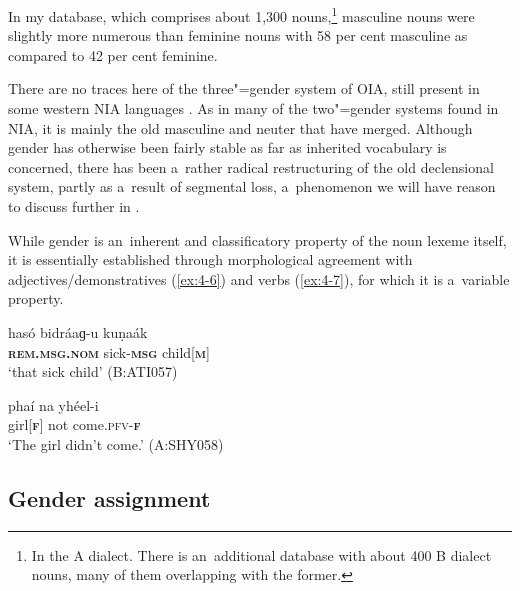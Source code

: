 In my database, which comprises about 1,300 nouns,\footnote{In the A dialect. There is an~additional database with about 400 B dialect nouns, many of them overlapping with the former.} masculine nouns were slightly more numerous than feminine nouns with 58 per cent masculine as compared to 42 per cent feminine.


There are no traces here of the three"=gender system of OIA, still present in some western NIA languages \citep[220--221]{masica1991}. As in many of the two"=gender systems found in NIA, it is mainly the old masculine and neuter that have merged. Although gender has otherwise been fairly stable as far as inherited vocabulary is concerned, there has been a~rather radical restructuring of the old declensional system, partly as a~result of segmental loss, a~phenomenon we will have reason to discuss further in .


While gender is an~inherent and classificatory property of the noun lexeme itself, it is essentially established through morphological agreement with adjectives/demonstratives (\ref{ex:4-6}) and verbs (\ref{ex:4-7}), for which it is a~variable property. 


\begin{exe}
\ex
\label{ex:4-6}
\gll hasó bidráaɡ-u kuṇaák \\
	\textbf{\textsc{rem.msg.nom}} sick-\textbf{\textsc{msg}} child[\textbf{\textsc{m}}] \\
\glt `that sick child' (B:ATI057)
\end{exe}

\begin{exe}
\ex
\label{ex:4-7}
\gll phaí na yhéel-i \\
	girl[\textbf{\textsc{f}}] not come.\textsc{pfv-\textbf{\textsc{f}}} \\
\glt `The girl didn't come.' (A:SHY058)
\end{exe}

\subsection{Gender assignment}
\label{subsec:4-3-1}


